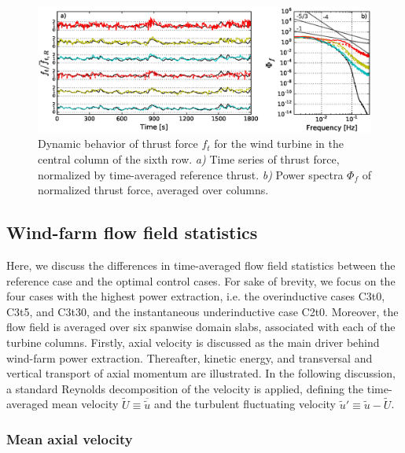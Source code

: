 \begin{figure}
	\includegraphics[width=\textwidth]{chapters/philtrans_torque/thrust_forces.eps}
	\caption[Dynamic behavior of thrust force $f_t$ for the wind turbine in the central column of the sixth row.]{Dynamic behavior of thrust force $f_t$ for the wind turbine in the central column of the sixth row. \emph{a)} Time series of thrust force, normalized by time-averaged reference thrust. \emph{b) } Power spectra $\Phi_f$ of normalized thrust force, averaged over columns. \legend \label{fig:thrust}}
\end{figure}




\subsection{Wind-farm flow field statistics}\label{sec:opt_ind_flow}

	Here, we discuss the differences in time-averaged flow field statistics between the reference case and the optimal control cases. For sake of brevity, we focus on the four cases with the highest power extraction, i.e. the overinductive cases C3t0, C3t5, and C3t30, and the instantaneous underinductive case C2t0. Moreover, the flow field is averaged over six spanwise domain slabs, associated with each of the turbine columns. Firstly, axial velocity is discussed as the main driver behind wind-farm power extraction. Thereafter, kinetic energy, and transversal and vertical transport of axial momentum are illustrated. In the following discussion, a standard Reynolds decomposition of the velocity is applied, defining the time-averaged mean velocity $\widetilde{U} \equiv \overline{\widetilde{u}}$ and the turbulent fluctuating velocity $\widetilde{u}' \equiv  \widetilde{u} - \widetilde{U}$.

	\subsubsection{Mean axial velocity}

